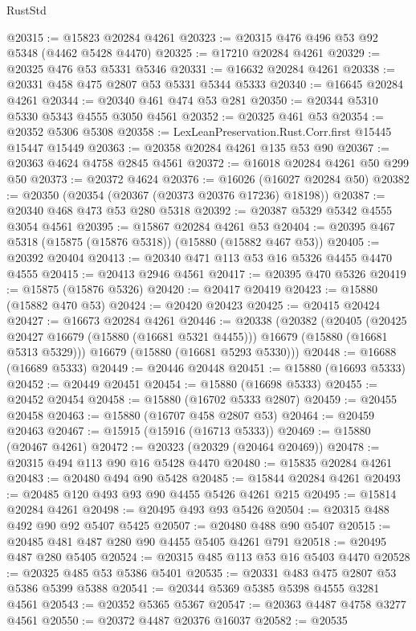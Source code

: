 \begin{lexlean}{RustStd}
\begin{coremodule}
@20315 := @15823 @20284 @4261
@20323 := @20315 @476 @496 @53 @92 @5348 (@4462 @5428 @4470)
@20325 := @17210 @20284 @4261
@20329 := @20325 @476 @53 @5331 @5346
@20331 := @16632 @20284 @4261
@20338 := @20331 @458 @475 @2807 @53 @5331 @5344 @5333
@20340 := @16645 @20284 @4261
@20344 := @20340 @461 @474 @53 @281
@20350 := @20344 @5310 @5330 @5343 @4555 @3050 @4561
@20352 := @20325 @461 @53
@20354 := @20352 @5306 @5308
@20358 := LexLeanPreservation.Rust.Corr.first @15445 @15447 @15449
@20363 := @20358 @20284 @4261 @135 @53 @90
@20367 := @20363 @4624 @4758 @2845 @4561
@20372 := @16018 @20284 @4261 @50 @299 @50
@20373 := @20372 @4624
@20376 := @16026 (@16027 @20284 @50)
@20382 := @20350 (@20354 (@20367 (@20373 @20376 @17236) @18198))
@20387 := @20340 @468 @473 @53 @280 @5318
@20392 := @20387 @5329 @5342 @4555 @3054 @4561
@20395 := @15867 @20284 @4261 @53
@20404 := @20395 @467 @5318 (@15875 (@15876 @5318)) (@15880 (@15882 @467 @53))
@20405 := @20392 @20404
@20413 := @20340 @471 @113 @53 @16 @5326 @4455 @4470 @4555
@20415 := @20413 @2946 @4561
@20417 := @20395 @470 @5326
@20419 := @15875 (@15876 @5326)
@20420 := @20417 @20419
@20423 := @15880 (@15882 @470 @53)
@20424 := @20420 @20423
@20425 := @20415 @20424
@20427 := @16673 @20284 @4261
@20446 := @20338
    (@20382
      (@20405
        (@20425 @20427 @16679 (@15880 (@16681 @5321 @4455)))
        @16679
        (@15880 (@16681 @5313 @5329)))
      @16679
      (@15880 (@16681 @5293 @5330)))
@20448 := @16688 (@16689 @5333)
@20449 := @20446 @20448
@20451 := @15880 (@16693 @5333)
@20452 := @20449 @20451
@20454 := @15880 (@16698 @5333)
@20455 := @20452 @20454
@20458 := @15880 (@16702 @5333 @2807)
@20459 := @20455 @20458
@20463 := @15880 (@16707 @458 @2807 @53)
@20464 := @20459 @20463
@20467 := @15915 (@15916 (@16713 @5333))
@20469 := @15880 (@20467 @4261)
@20472 := @20323 (@20329 (@20464 @20469))
@20478 := @20315 @494 @113 @90 @16 @5428 @4470
@20480 := @15835 @20284 @4261
@20483 := @20480 @494 @90 @5428
@20485 := @15844 @20284 @4261
@20493 := @20485 @120 @493 @93 @90 @4455 @5426 @4261 @215
@20495 := @15814 @20284 @4261
@20498 := @20495 @493 @93 @5426
@20504 := @20315 @488 @492 @90 @92 @5407 @5425
@20507 := @20480 @488 @90 @5407
@20515 := @20485 @481 @487 @280 @90 @4455 @5405 @4261 @791
@20518 := @20495 @487 @280 @5405
@20524 := @20315 @485 @113 @53 @16 @5403 @4470
@20528 := @20325 @485 @53 @5386 @5401
@20535 := @20331 @483 @475 @2807 @53 @5386 @5399 @5388
@20541 := @20344 @5369 @5385 @5398 @4555 @3281 @4561
@20543 := @20352 @5365 @5367
@20547 := @20363 @4487 @4758 @3277 @4561
@20550 := @20372 @4487 @20376 @16037
@20582 := @20535

\end{coremodule}
\end{lexlean}

